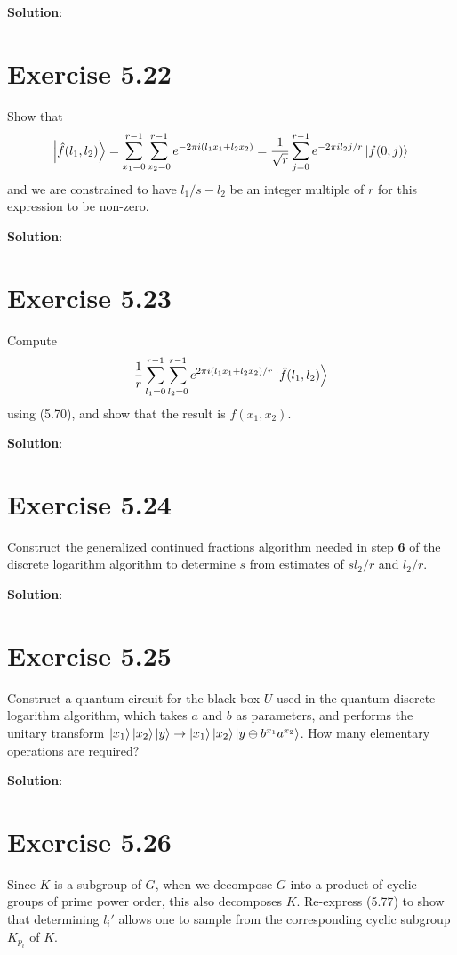 \documentclass{book}
\begin{document}
    \textbf{Solution}:
    
\section*{Exercise 5.22}
    Show that
    \begin{align}
        \ket{\hat{f}(l_1,l_2)} = \sum_{x_1=0}^{r-1} \sum_{x_2 = 0}^{r-1}e^{-2\pi i(l_1x_1+l_2x_2)} = \frac{1}{\sqrt{r}} \sum_{j=0}^{r-1}e^{-2\pi i l_2 j /r}\ket{f(0,j)}
    \end{align}
    and we are constrained to have $l_1/s-l_2$ be an integer multiple of $r$ for this expression to be non-zero.
    
    \textbf{Solution}:
    
\section*{Exercise 5.23}
    Compute
    \begin{align}
        \frac{1}{r}\sum_{l_1=0}^{r-1}\sum_{l_2=0}^{r-1} e^{2\pi i (l_1x_1+l_2x_2)/r}\ket{\hat{f}(l_1,l_2)}
    \end{align}
    using (5.70), and show that the result is $f(x_1,x_2)$.
    
    \textbf{Solution}:
    
\section*{Exercise 5.24}
    Construct the generalized continued fractions algorithm needed in step \textbf{6} of the discrete logarithm algorithm to determine $s$ from estimates of $s l_2/r$ and $l_2/r$.
    
    \textbf{Solution}:
    
\section*{Exercise 5.25}
    Construct a quantum circuit for the black box $U$ used in the quantum discrete logarithm algorithm, which takes $a$ and $b$ as parameters, and performs the unitary transform $\ket{x_1}\ket{x_2}\ket{y}\rightarrow\ket{x_1}\ket{x_2}\ket{y\oplus b^{x_1}a^{x_2}}$. How many elementary operations are required?
    
    \textbf{Solution}:
    
\section*{Exercise 5.26}
    Since $K$ is a subgroup of $G$, when we decompose $G$ into a product of cyclic groups of prime power order, this also decomposes $K$. Re-express (5.77) to show that determining $l_i'$ allows one to sample from the corresponding cyclic subgroup $K_{p_i}$ of $K$.
    
\end{document}
